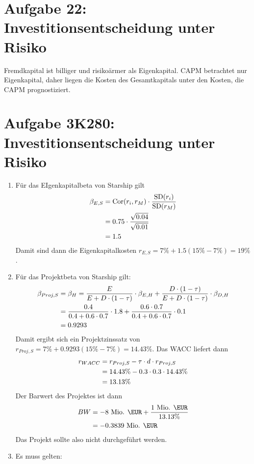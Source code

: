 \documentclass{article}
\DeclareMathOperator{\SD}{SD}
\DeclareMathOperator{\Cor}{Cor}
\begin{document}
	\section*{Aufgabe 22: Investitionsentscheidung unter Risiko}
	Fremdkapital ist billiger und risikoärmer als Eigenkapital. CAPM betrachtet nur Eigenkapital, daher liegen die Kosten des Gesamtkapitals unter den Kosten, die CAPM prognostiziert.

	\section*{Aufgabe 3K280: Investitionsentscheidung unter Risiko}
	\begin{enumerate}[label=(\alph*)]
		\item Für das EIgenkapitalbeta von Starship gilt
		\begin{align}
			\beta_{E,S} &= \Cor(r_i,r_M)\cdot\frac{\SD(r_i)}{\SD(r_M)} \notag \\
			&= 0.75\cdot \frac{\sqrt{0.04}}{\sqrt{0.01}} \notag \\
			&= 1.5 \notag
		\end{align}
		Damit sind dann die Eigenkapitalkosten $r_{E,S}=7\% + 1.5(15\%-7\%)=19\%$.
		\item Für das Projektbeta von Starship gilt:
		\begin{align}
			\beta_{Proj,S} &= \beta_H = \frac{E}{E+D\cdot(1-\tau)}\cdot \beta_{E,H} + \frac{D\cdot (1-\tau)}{E+D\cdot (1-\tau)}\cdot\beta_{D,H} \notag \\
			&= \frac{0.4}{0.4 + 0.6\cdot 0.7}\cdot 1.8 + \frac{0.6\cdot 0.7}{0.4 + 0.6\cdot 0.7}\cdot 0.1 \notag \\
			&= 0.9293 \notag
		\end{align}
		Damit ergibt sich ein Projektzinssatz von $r_{Proj,S}=7\% + 0.9293(15\%-7\%)=14.43\%$. Das WACC liefert dann
		\begin{align}
			r_{WACC} &= r_{Proj,S} - \tau\cdot d\cdot r_{Proj,S} \notag \\
			&= 14.43\% - 0.3\cdot 0.3\cdot 14.43\% \notag \\
			&= 13.13\% \notag
		\end{align}
		Der Barwert des Projektes ist dann
		\begin{align}
			BW &= -8\text{ Mio. \EUR} + \frac{1\text{ Mio. \EUR}}{13.13\%} \notag \\
			&= -0.3839\text{ Mio. \EUR} \notag
		\end{align}
		Das Projekt sollte also nicht durchgeführt werden.
		\item Es muss gelten:

\end{enumerate}
\end{document}
